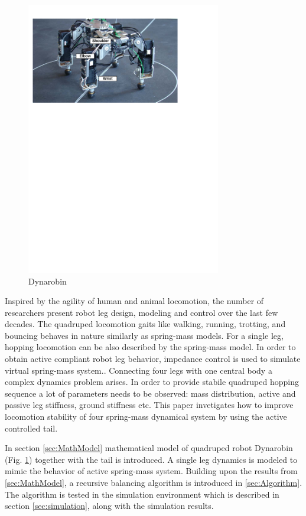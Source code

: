 \begin{figure}
	\centering
	\includegraphics[width=85mm]{./pictures/Dynarobin_introduction_image.pdf}
	\caption{Dynarobin}
	\label{fig:Dynarobin}
\end{figure}

Inspired by the agility of human and animal locomotion, the number of researchers present robot leg design, modeling and control over the last few decades\cite{CambridgeJournals:1345088}. The quadruped locomotion gaits like walking, running, trotting, and bouncing behaves in nature similarly as spring-mass models\cite{Blickhan01}. For a single leg, hopping locomotion can be also described by the spring-mass model. In order to obtain active compliant robot leg behavior, impedance control is used to simulate virtual spring-mass system.\cite{Havoutis01}. Connecting four legs with one central body a complex dynamics problem arises. In order to provide stabile quadruped hopping sequence a lot of parameters needs to be observed: mass distribution, active and passive leg stiffness, ground stiffness etc. This paper invetigates how to improve locomotion stability of four spring-mass dynamical system by using the active controlled tail.

In section \ref{sec:MathModel} mathematical model of quadruped robot Dynarobin (Fig. \ref{fig:Dynarobin}) together with the tail is introduced. A single leg dynamics is modeled to mimic the behavior of active spring-mass system. Building upon the results from \ref{sec:MathModel}, a recursive balancing algorithm is introduced in \ref{sec:Algorithm}. The algorithm is tested in the simulation environment which is described in section \ref{sec:simulation}, along with the simulation results. 







